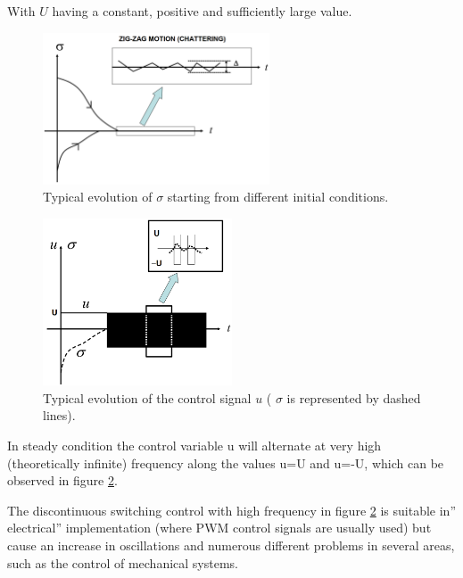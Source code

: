 \documentclass{thesisreport}
\begin{document}
With $U$ having a constant, positive and sufficiently large value.

\begin{figure}[h]
\centering
\includegraphics[width=0.6\textwidth]{Images/Control/first_order_sliding_mode_control}
\caption{Typical evolution of $\sigma$ starting from different initial conditions. \cite{DeCarlo2008}}
\label{sigma_evolution}
\end{figure}

\newpage

\begin{figure}[h]
\centering
\includegraphics[width=0.5\textwidth]{Images/Control/first_order_sliding_mode_control_b}
\caption{Typical evolution of the control signal $u$ ( $\sigma$ is represented by dashed lines). \cite{DeCarlo2008}}
\label{control_evolution}
\end{figure}


\noindent In steady condition the control variable u will alternate at very high (theoretically infinite) frequency along the values u=U
and u=-U, which can be observed in figure \ref{control_evolution}.



\noindent The discontinuous switching control with high frequency  in figure \ref{control_evolution} is suitable in” electrical” implementation (where PWM control signals are usually used) but cause an increase in oscillations and numerous different problems in several areas, such as the control of mechanical systems.
\end{document}
